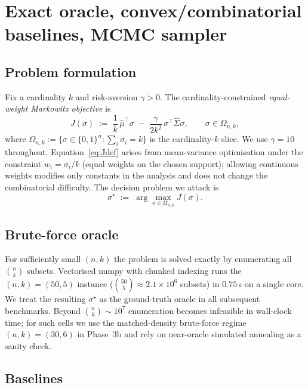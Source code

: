 
\section{Exact oracle, convex/combinatorial baselines, MCMC sampler}\label{sec:oracle}

\subsection{Problem formulation}\label{ssec:formulation}

Fix a cardinality $k$ and risk-aversion $\gamma>0$. The cardinality-constrained
\emph{equal-weight Markowitz objective} is
\begin{equation}\label{eq:Jdef}
  J(\sigma) \;:=\; \frac{1}{k}\, \hat\mu^\top\sigma \;-\; \frac{\gamma}{2 k^2}\,\sigma^\top
  \hat\Sigma\sigma, \qquad \sigma\in\Omega_{n,k},
\end{equation}
where $\Omega_{n,k} := \{\sigma\in\{0,1\}^n : \sum_i\sigma_i = k\}$ is the cardinality-$k$
slice. We use $\gamma=10$ throughout. Equation~\eqref{eq:Jdef} arises from
mean-variance optimisation under the constraint $w_i = \sigma_i / k$ (equal weights on
the chosen support); allowing continuous weights modifies only constants in the analysis
and does not change the combinatorial difficulty. The decision problem we attack is
\begin{equation}\label{eq:problem}
  \sigma^\star \;:=\; \arg\max_{\sigma\in\Omega_{n,k}} J(\sigma).
\end{equation}

\subsection{Brute-force oracle}\label{ssec:oracle}

For sufficiently small $(n,k)$ the problem is solved exactly by enumerating all
$\binom{n}{k}$ subsets. Vectorised numpy with chunked indexing runs the
$(n,k)=(50,5)$ instance ($\binom{50}{5}\approx 2.1\times 10^6$ subsets) in $0.75$\,s
on a single core. We treat the resulting $\sigma^\star$ as the ground-truth oracle in
all subsequent benchmarks. Beyond $\binom{n}{k}\sim 10^7$ enumeration becomes infeasible
in wall-clock time; for such cells we use the matched-density brute-force regime
$(n,k)=(30,6)$ in Phase~3b and rely on near-oracle simulated annealing as a sanity check.

\subsection{Baselines}\label{sec:lasso}

